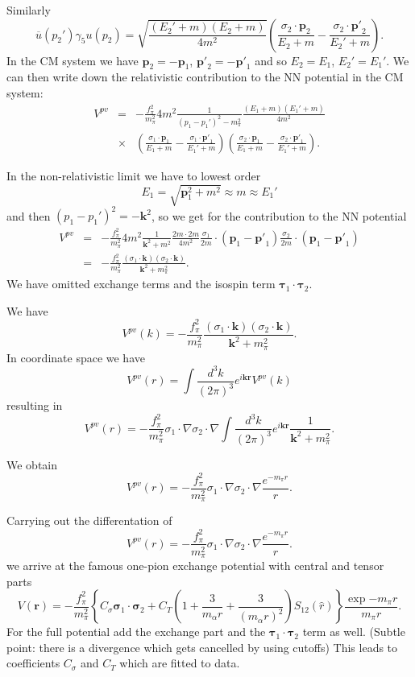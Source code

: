 \documentclass[%
oneside,                 %
final,                   %
10pt]{article}
\begin{document}
Similarly
\[
\overline{u}(p_{2}')\gamma_{5}u(p_{2})=\sqrt{\frac{(E_{2}'+m)(E_{2}+m)}
{4m^{2}}}\left(\frac{\sigma_{2}\cdot \mathbf{p}_{2}}{E_{2}+m}-
\frac{\sigma_{2}\cdot\mathbf{p'}_{2}}{E_{2}'+m}\right).
\]
In the CM system we have $\mathbf{p}_{2}=-\mathbf{p}_{1}$, $\mathbf{p'}_{2}=
-\mathbf{p'}_{1}$ and so $E_{2}=E_{1}$, $E_{2}'=E_{1}'$.  
We can then write down the relativistic contribution 
to the NN potential in the CM system: 
\begin{eqnarray}
V^{pv}&=&-\frac{f_{\pi}^{2}}{m_{\pi}^{2}}4m^{2}\frac{1}{(p_{1}-p_{1}')^{2}-
m_{\pi}^{2}}\frac{(E_{1}+m)(E_{1}'+m)}{4m^{2}} \nonumber \\ 
 &\times&\left(\frac{\sigma_{1}\cdot\mathbf{p}_{1}}{E_{1}+m}-\frac{\sigma_{1}
\cdot\mathbf{p'}_{1}}{E_{1}'+m}\right)\left(\frac{\sigma_{2}\cdot\mathbf{p}_{1}}
{E_{1}+m}-\frac{\sigma_{2}\cdot\mathbf{p'}_{1}}{E_{1}'+m}\right). \nonumber
\end{eqnarray}

In the non-relativistic limit we have to lowest order 
\[
E_{1}=\sqrt{\mathbf{p}_{1}^{2}+m^{2}}\approx m \approx E_{1}'
\]
and then $(p_{1}-p_{1}')^{2}=-\mathbf{k}^{2}$, so we get 
for the contribution to the NN potential
\begin{eqnarray}
V^{pv}&=&-\frac{f_{\pi}^{2}}{m_{\pi}^{2}}4m^{2}\frac{1}{\mathbf{k}^{2}+m^{2}}
\frac{2m\cdot 2m}{4m^{2}}\frac{\sigma_{1}}{2m}\cdot(\mathbf{p}_{1}-\mathbf{p'}_{1})
\frac{\sigma_{2}}{2m}\cdot (\mathbf{p}_{1}-\mathbf{p'}_{1}) \nonumber \\ 
 &=&-\frac{f_{\pi}^{2}}{m_{\pi}^{2}}
\frac{(\sigma_{1}\cdot\mathbf{k})(\sigma_{2}\cdot\mathbf{k})}{\mathbf{k}^{2}+m_{\pi}^{2}}.
\nonumber
\end{eqnarray}
We have omitted exchange terms and the isospin term $\mathbf{\tau}_1\cdot\mathbf{\tau}_2$.

We have
\[
V^{pv}(k)=-\frac{f_{\pi}^{2}}{m_{\pi}^{2}}
\frac{(\sigma_{1}\cdot\mathbf{k})(\sigma_{2}\cdot\mathbf{k})}{\mathbf{k}^{2}+m_{\pi}^{2}}.
\]
In coordinate space we have
\[
V^{pv}(r)=\int\frac{d^3k}{(2\pi)^3}e^{i\mathbf{kr}}V^{pv}(k)
\]
resulting in
\[
  V^{pv}(r)=-\frac{f_{\pi}^{2}}{m_{\pi}^{2}}
\sigma_{1}\cdot{\nabla}\sigma_{2}\cdot{\nabla}
\int\frac{d^3k}{(2\pi)^3}e^{i\mathbf{kr}}\frac{1}{\mathbf{k}^{2}+m_{\pi}^{2}}.
\]

We obtain
\[
V^{pv}(r)=-\frac{f_{\pi}^{2}}{m_{\pi}^{2}}\sigma_{1}\cdot{\nabla}\sigma_{2}\cdot{\nabla}\frac{e^{-m_{\pi}r}}{r}.
\]

Carrying out the differentation of
\[
V^{pv}(r)=-\frac{f_{\pi}^{2}}{m_{\pi}^{2}}\sigma_{1}\cdot{\nabla}\sigma_{2}\cdot{\nabla}\frac{e^{-m_{\pi}r}}{r}.
\]
we arrive at the famous one-pion exchange potential with central and tensor parts
\[
V(\mathbf{r})= -\frac{f_{\pi}^{2}}{m_{\pi}^{2}}\left\{C_{\sigma}\mathbf{\sigma}_1\cdot\mathbf{\sigma}_2+ C_T \left( 1 + \frac{3}{m_\alpha r} + \frac{3}{\left(m_\alpha r\right)^2}\right) S_{12}(\hat r)\right\}\frac{\exp{-m_\pi r}}{m_\pi r}.
\]
For the full potential add the exchange part and the $\mathbf{\tau}_1\cdot\mathbf{\tau}_2$ term as well. (Subtle point: there is a divergence which gets cancelled by using cutoffs) This leads to coefficients $C_{\sigma}$ and $C_T$ which are fitted to data.
\end{document}
